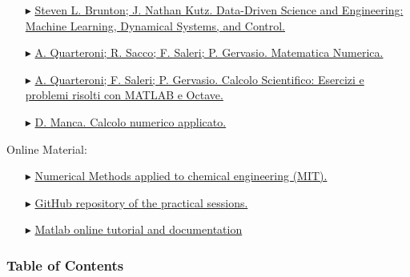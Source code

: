 \documentclass[xcolor={dvipsnames,rgb}, aspectratio=169]{beamer}
\begin{document}
\begin{frame}{}
   \begin{itemize}
      \item[$\blacktriangleright$]
         \href{https://www.amazon.it/Data-Driven-Science-Engineering-Learning-Dynamical/dp/1009098489/ref=asc_df_1009098489/?tag=googshopit-21&linkCode=df0&hvadid=560287860614&hvpos=&hvnetw=g&hvrand=14266207767663986773&hvpone=&hvptwo=&hvqmt=&hvdev=c&hvdvcmdl=&hvlocint=&hvlocphy=1008463&hvtargid=pla-1599460130783&psc=1}{\footnotesize
         Steven L. Brunton; J. Nathan Kutz. Data-Driven Science and Engineering: Machine
         Learning, Dynamical Systems, and Control.}
      \item[$\blacktriangleright$]
         \href{https://link.springer.com/book/10.1007/978-88-470-5644-2}{\footnotesize A.
         Quarteroni; R. Sacco; F. Saleri; P. Gervasio. Matematica Numerica.}
      \item[$\blacktriangleright$]
         \href{https://www.amazon.it/Calcolo-Scientifico-Esercizi-problemi-risolti-dp-8847039525/dp/8847039525/ref=dp_ob_title_bk}{\footnotesize
         A. Quarteroni; F. Saleri; P. Gervasio. Calcolo Scientifico: Esercizi e problemi
         risolti con MATLAB e Octave.}
      \item[$\blacktriangleright$]
         \href{https://www.ibs.it/calcolo-numerico-applicato-libro-davide-manca/e/9788837116972}{\footnotesize
         D. Manca. Calcolo numerico applicato.}
   \end{itemize}
   \small \alert{Online Material}:
      \begin{itemize}
         \item[$\blacktriangleright$]
            \href{https://ocw.mit.edu/courses/10-34-numerical-methods-applied-to-chemical-engineering-fall-2015/pages/syllabus/}{\footnotesize
            Numerical Methods applied to chemical engineering (MIT).}
         \item[$\blacktriangleright$]
            \href{https://github.com/Titodinelli/Calcoli-di-Processo-dell-Ingegneria-Chimica}{\footnotesize
            GitHub repository of the practical sessions.}
         \item[$\blacktriangleright$]
            \href{https://it.mathworks.com/help/matlab/getting-started-with-matlab.html}{\footnotesize
            Matlab online tutorial and documentation}
    \end{itemize}
\end{frame}

\begin{frame}
   \frametitle{Table of Contents}
   \hypersetup{linkcolor=black}{\tableofcontents}
\end{frame}
\end{document}
